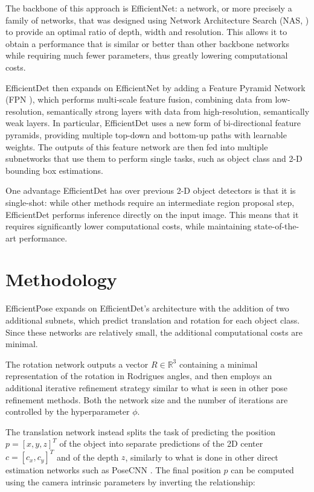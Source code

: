 The backbone of this approach is EfficientNet: a network, or more precisely a family of networks, that was designed using Network Architecture Search (NAS, \cite{NAS}) to provide an optimal ratio of depth, width and resolution. This allows it to obtain a performance that is similar or better than other backbone networks while requiring much fewer parameters, thus greatly lowering computational costs.

EfficientDet then expands on EfficientNet by adding a Feature Pyramid Network (FPN \cite{FPN}), which performs multi-scale feature fusion, combining data from low-resolution, semantically strong layers with data from high-resolution, semantically weak layers. In particular, EfficientDet uses a new form of bi-directional feature pyramids, providing multiple top-down and bottom-up paths with learnable weights. The outputs of this feature network are then fed into multiple subnetworks that use them to perform single tasks, such as object class and 2-D bounding box estimations.

One advantage EfficientDet has over previous 2-D object detectors is that it is single-shot: while other methods require an intermediate region proposal step, EfficientDet performs inference directly on the input image. This means that it requires significantly lower computational costs, while maintaining state-of-the-art performance.

\section{Methodology}

EfficientPose expands on EfficientDet's architecture with the addition of two additional subnets, which predict translation and rotation for each object class. Since these networks are relatively small, the additional computational costs are minimal.

The rotation network outputs a vector $R \in \mathbb{R}^3$ containing a minimal representation of the rotation in Rodrigues angles, and then employs an additional iterative refinement strategy similar to what is seen in other pose refinement methods. Both the network size and the number of iterations are controlled by the hyperparameter $\phi$.

The translation network instead splits the task of predicting the position $p=[x, y, z]^T$ of the object into separate predictions of the 2D center $c = [c_x, c_y]^T$ and of the depth $z$, similarly to what is done in other direct estimation networks such as PoseCNN \cite{PoseCNN}. The final position $p$ can be computed using the camera intrinsic parameters by inverting the relationship:

